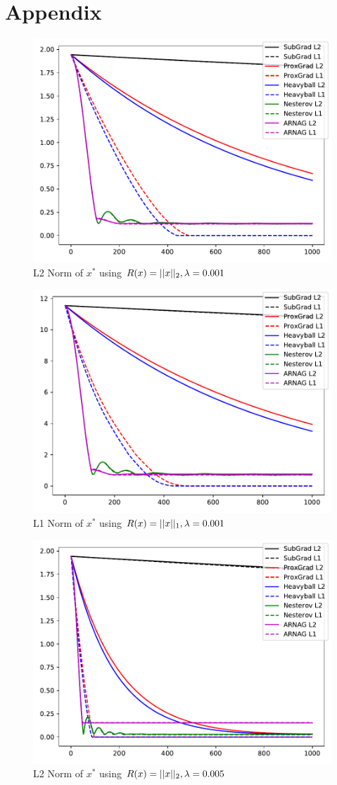 \documentclass[11pt, answers]{exam}
\begin{document}
\section{Appendix}
		\begin{figure}[H]
		\centering
		\includegraphics[width=.75\textwidth]{../out/001xl2.pdf}
		\caption{L2 Norm of $x^*$ using $R(x)=|| x ||_2,\lambda=0.001$}
		\end{figure}
		\begin{figure}[H]
		\centering
		\includegraphics[width=.75\textwidth]{../out/001xl1.pdf}
		\caption{L1 Norm of $x^*$ using $R(x)=|| x ||_1,\lambda=0.001$}
		\end{figure}		\begin{figure}[H]
		\centering
		\includegraphics[width=.75\textwidth]{../out/005xl2.pdf}
		\caption{L2 Norm of $x^*$ using $R(x)=|| x ||_2,\lambda=0.005$}
		\end{figure}
\end{document}
